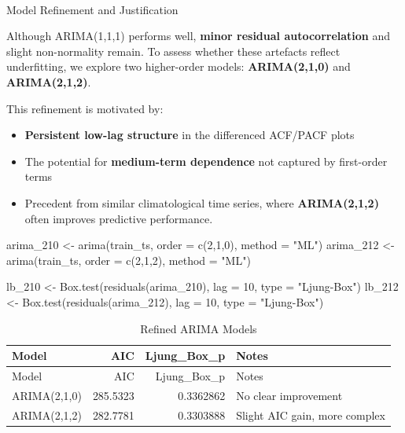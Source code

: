 \documentclass[
  11pt,
]{article}
\makeatletter
\let\oldparagraph\paragraph
\renewcommand{\paragraph}{
    \@ifstar
      \xxxParagraphStar
      \xxxParagraphNoStar
  }
\newcommand{\xxxParagraphStar}[1]{\oldparagraph*{#1}\mbox{}}
\newcommand{\xxxParagraphNoStar}[1]{\oldparagraph{#1}\mbox{}}
\newenvironment{Shaded}{\begin{snugshade}}{\end{snugshade}}
\newcommand{\AttributeTok}[1]{\textcolor[rgb]{0.40,0.45,0.13}{#1}}
\newcommand{\DecValTok}[1]{\textcolor[rgb]{0.68,0.00,0.00}{#1}}
\newcommand{\FunctionTok}[1]{\textcolor[rgb]{0.28,0.35,0.67}{#1}}
\newcommand{\NormalTok}[1]{\textcolor[rgb]{0.00,0.23,0.31}{#1}}
\newcommand{\OtherTok}[1]{\textcolor[rgb]{0.00,0.23,0.31}{#1}}
\newcommand{\StringTok}[1]{\textcolor[rgb]{0.13,0.47,0.30}{#1}}
\makeatother
\begin{document}
\paragraph{Model Refinement and
Justification}\label{model-refinement-and-justification}

Although ARIMA(1,1,1) performs well, \textbf{minor residual
autocorrelation} and slight non-normality remain. To assess whether
these artefacts reflect underfitting, we explore two higher-order
models: \textbf{ARIMA(2,1,0)} and \textbf{ARIMA(2,1,2)}.

This refinement is motivated by:

\begin{itemize}
\item
  \textbf{Persistent low-lag structure} in the differenced ACF/PACF
  plots
\item
  The potential for \textbf{medium-term dependence} not captured by
  first-order terms
\item
  Precedent from similar climatological time series, where
  \textbf{ARIMA(2,1,2)} often improves predictive performance.
\end{itemize}

\begin{Shaded}
\begin{Highlighting}[]
\NormalTok{arima\_210 }\OtherTok{\textless{}{-}} \FunctionTok{arima}\NormalTok{(train\_ts, }\AttributeTok{order =} \FunctionTok{c}\NormalTok{(}\DecValTok{2}\NormalTok{,}\DecValTok{1}\NormalTok{,}\DecValTok{0}\NormalTok{), }\AttributeTok{method =} \StringTok{"ML"}\NormalTok{)}
\NormalTok{arima\_212 }\OtherTok{\textless{}{-}} \FunctionTok{arima}\NormalTok{(train\_ts, }\AttributeTok{order =} \FunctionTok{c}\NormalTok{(}\DecValTok{2}\NormalTok{,}\DecValTok{1}\NormalTok{,}\DecValTok{2}\NormalTok{), }\AttributeTok{method =} \StringTok{"ML"}\NormalTok{)}

\NormalTok{lb\_210 }\OtherTok{\textless{}{-}} \FunctionTok{Box.test}\NormalTok{(}\FunctionTok{residuals}\NormalTok{(arima\_210), }\AttributeTok{lag =} \DecValTok{10}\NormalTok{, }\AttributeTok{type =} \StringTok{"Ljung{-}Box"}\NormalTok{)}
\NormalTok{lb\_212 }\OtherTok{\textless{}{-}} \FunctionTok{Box.test}\NormalTok{(}\FunctionTok{residuals}\NormalTok{(arima\_212), }\AttributeTok{lag =} \DecValTok{10}\NormalTok{, }\AttributeTok{type =} \StringTok{"Ljung{-}Box"}\NormalTok{)}
\end{Highlighting}
\end{Shaded}

\begin{longtable}[]{@{}lrrl@{}}
\caption{Refined ARIMA Models}\tabularnewline
\toprule\noalign{}
Model & AIC & Ljung\_Box\_p & Notes \\
\midrule\noalign{}
\endfirsthead
\toprule\noalign{}
Model & AIC & Ljung\_Box\_p & Notes \\
\midrule\noalign{}
\endhead
\bottomrule\noalign{}
\endlastfoot
ARIMA(2,1,0) & 285.5323 & 0.3362862 & No clear improvement \\
ARIMA(2,1,2) & 282.7781 & 0.3303888 & Slight AIC gain, more complex \\
\end{longtable}
\end{document}
